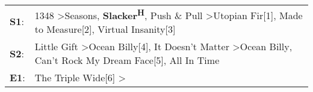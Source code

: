 \begin{supertabular}{p{0.03\textwidth}p{0.92\textwidth}}
 \textbf{S1}:  &  1348\textsuperscript{} \textgreater \enspace Seasons\textsuperscript{}, \enspace \textbf{Slacker\textsuperscript{H}}, \enspace Push \& Pull\textsuperscript{} \textgreater \enspace Utopian Fir[1]\textsuperscript{}, \enspace Made to Measure[2]\textsuperscript{}, \enspace Virtual Insanity[3]\textsuperscript{}  \enspace  \\
 \textbf{S2}:  &                               Little Gift\textsuperscript{} \textgreater \enspace Ocean Billy[4]\textsuperscript{}, \enspace It Doesn't Matter\textsuperscript{} \textgreater \enspace Ocean Billy\textsuperscript{}, \enspace Can't Rock My Dream Face[5]\textsuperscript{}, \enspace All In Time\textsuperscript{}  \enspace  \\
 \textbf{E1}:  &                                                                                                                                                                                                                                    The Triple Wide[6]\textsuperscript{} \textgreater {}\textsuperscript{}  \enspace  \\
\end{supertabular}
